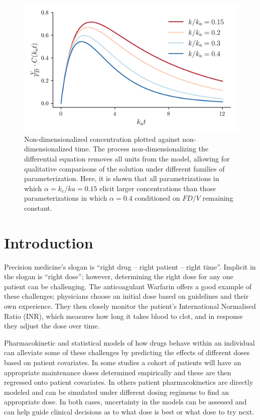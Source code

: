 \begin{figure}[h!]
	\centering
	\includegraphics{figures/pkcurves.png}
	\caption[Non-dimensionalized solutions to pharmacokinetic differential equation] {Non-dimensionalized concentration plotted against non-dimensionalized time.  The process non-dimensionalizing the differential equation removes all units from the model, allowing for qualitative comparisons of the solution under different families of parameterization.  Here, it is shown that all parametrizations in which $\alpha = k_e/ka = 0.15$ elicit larger concentrations than those parameterizations in which $\alpha=0.4$ conditioned on $FD/V$ remaining constant.}
	\label{fig:pkcureves}
\end{figure}



\section{Introduction}

Precision medicine’s slogan is ``right drug -- right patient -- right time''.  Implicit in the slogan is ``right dose''; however, determining the right dose for any one patient can be challenging. The anticoagulant Warfarin offers a good example of these challenges; physicians choose an initial dose based on guidelines and their own experience. They then closely monitor the patient’s International Normalised Ratio (INR), which measures how long it takes blood to clot, and in response they adjust the dose over time.

Pharmacokinetic and statistical models of how drugs behave within an individual can alleviate some of these challenges by predicting the effects of different doses based on patient covariates. In some studies \cite{schwarz2008genetic,Sohrabi2017-zv, Caldwell2007-mi}  a cohort of patients will have an appropriate maintenance doses determined empirically and these are then regressed onto patient covariates.  In others \cite{ohara2019differences,Zhu2017-rk, Xue2017-mp}  patient pharmacokinetics are directly modeled and can be simulated under different dosing regimens to find an appropriate dose.  In both cases, uncertainty in the models can be assessed and can help guide clinical decisions as to what dose is best or what dose to try next.


